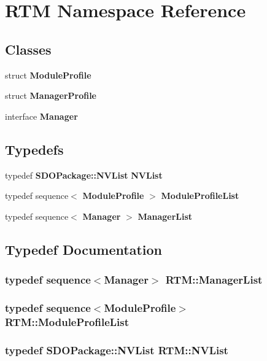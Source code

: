 \section{RTM Namespace Reference}
\label{namespaceRTM}
\subsection*{Classes}
\begin{DoxyCompactItemize}
\item 
struct {\bf ModuleProfile}
\item 
struct {\bf ManagerProfile}
\item 
interface {\bf Manager}
\end{DoxyCompactItemize}
\subsection*{Typedefs}
\begin{DoxyCompactItemize}
\item 
typedef {\bf SDOPackage::NVList} {\bf NVList}
\item 
typedef sequence$<$ {\bf ModuleProfile} $>$ {\bf ModuleProfileList}
\item 
typedef sequence$<$ {\bf Manager} $>$ {\bf ManagerList}
\end{DoxyCompactItemize}


\subsection{Typedef Documentation}
\subsubsection[{ManagerList}]{\setlength{\rightskip}{0pt plus 5cm}typedef sequence$<${\bf Manager}$>$ {\bf RTM::ManagerList}}\label{namespaceRTM_addca378d20c0696c09cb3d748e9cc00e}
\subsubsection[{ModuleProfileList}]{\setlength{\rightskip}{0pt plus 5cm}typedef sequence$<${\bf ModuleProfile}$>$ {\bf RTM::ModuleProfileList}}\label{namespaceRTM_ad72e4fc13cf5a19fc5b766a4be388f89}
\subsubsection[{NVList}]{\setlength{\rightskip}{0pt plus 5cm}typedef {\bf SDOPackage::NVList} {\bf RTM::NVList}}\label{namespaceRTM_a45f18393ee434c9e3a1432820eb3a4fe}
